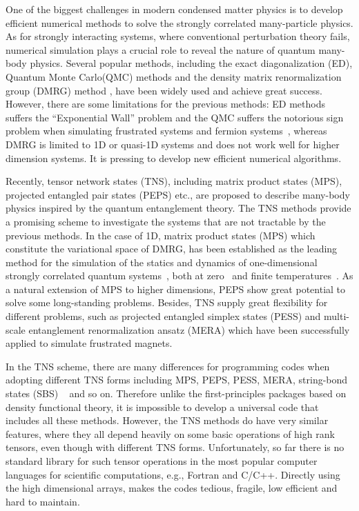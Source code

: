 \documentclass[preprint,3p,times,preprint,showpacs,amsmath,superscriptaddress,floatfix]{elsarticle}
\begin{document}
One of the biggest challenges in modern condensed matter physics is to develop efficient numerical methods to
solve the strongly correlated many-particle physics. As for strongly interacting systems, where conventional perturbation theory fails, numerical simulation plays a crucial role to reveal the nature of quantum many-body physics. Several popular methods, including the exact diagonalization (ED), Quantum Monte Carlo(QMC) methods \cite{Kashurnikov2007,Sandvik2002} and the density matrix renormalization group (DMRG) method \cite{white92,white93} , have been widely used and achieve great success. However, there are some limitations for the previous methods: ED methods suffers the ``Exponential Wall'' problem and the QMC suffers the notorious sign problem when simulating frustrated systems and fermion systems~\cite{Troyer05}, whereas DMRG is limited to 1D or quasi-1D systems and does not work well for higher dimension systems\cite{Schollwoeck2011}. It is pressing to develop new efficient numerical algorithms.

Recently, tensor network states (TNS), including matrix product states (MPS)\cite{Vidal2003}, projected entangled pair states (PEPS)\cite{Verstraete2004} etc., are proposed to describe many-body physics inspired by the quantum entanglement theory. The TNS methods provide a promising scheme to investigate the systems that are not tractable by the previous methods. In the case of 1D, matrix product states (MPS) which constitute the variational space of DMRG, has been established as the leading method for the simulation of the statics and dynamics of one-dimensional strongly correlated quantum systems~\cite{Karrasch2012,Huang2014}, both at zero~\cite{Vidal2007} and finite temperatures~\citep{Barthel2013}. As a natural extension of MPS to higher dimensions, PEPS show great potential to solve some long-standing problems\cite{Verstraete06,Verstraete2008,wang16,liu16}. Besides, TNS supply great flexibility for different problems, such as projected entangled simplex states (PESS)\cite{xie2014} and multi-scale entanglement renormalization ansatz (MERA) \cite{Vidal2008} which have been successfully applied to simulate frustrated magnets\cite{xiang2016,Evenbly2010}.

In the TNS scheme, there are many differences for programming codes when adopting different TNS forms including MPS, PEPS, PESS, MERA, string-bond states (SBS) ~\cite{Cirac2010} and so on. Therefore unlike the first-principles packages based on density functional theory, it is impossible to develop a universal code that includes all these methods.
However, the TNS methods do have very similar features, where they all depend heavily on some basic
operations of high rank tensors, even though with different TNS forms. Unfortunately,
so far there is no standard library for such tensor operations in the most popular computer languages for scientific computations, e.g.,
Fortran and C/C++.
Directly using the high dimensional arrays, makes the codes tedious, fragile, low efficient and hard to maintain.
\end{document}
